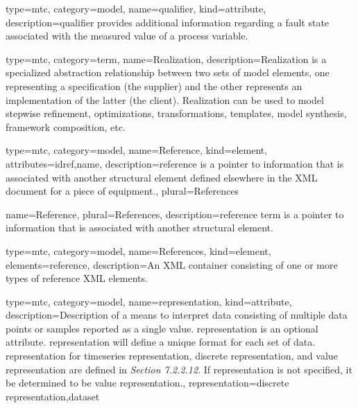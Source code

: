 {
  type=mtc,
  category=model,
  name={qualifier},
  kind={attribute},
  description={\gls{qualifier} provides additional information regarding a \gls{fault state} associated with the measured value of a process variable.}
}


{
  type=mtc,
  category=term,
  name={Realization},
  description={Realization is a specialized abstraction relationship between two sets of model elements, one representing a specification (the supplier) and the other represents an implementation of the latter (the client). Realization can be used to model stepwise refinement, optimizations, transformations, templates, model synthesis, framework composition, etc.}
}


{
  type={mtc},
  category=model,
  name={Reference},
  kind={element},
  attributes={\gls{idref},\gls{name}},
  description={\gls{reference} is a pointer to information that is associated with another \gls{structural element} defined elsewhere in the XML document for a piece of equipment.},
  plural={References}
}

{
  name={Reference},
  plural={References},
  description={\gls{reference term} is a pointer to information that is associated with another \gls{structural element}.}
}

{
  type=mtc,
  category=model,
  name={References},
  kind={element},
  elements={\gls{reference}},
  description={An XML container consisting of one or more types of \gls{reference} XML elements.}
}


{
  type=mtc,
  category=model,
  name={representation},
  kind={attribute},
  description={Description of a means to interpret data consisting of multiple data points or samples reported as a single value.  \newline \gls{representation} is an optional attribute.  \newline \gls{representation} will define a unique format for each set of data.  \newline \gls{representation} for \gls{timeseries representation}, \gls{discrete representation}, and \gls{value representation} are defined in  \textit{Section 7.2.2.12}.  \newline If \gls{representation} is not specified, it \MUST be determined to be \gls{value representation}.},
  representation={\gls{discrete representation},\gls{dataset}}
}

